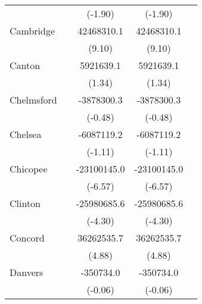{\begin{tabular}{l*{4}{c}}
                    &                     &     (-1.90)         &     (-1.90)         &                     \\
\addlinespace
Cambridge           &                     &  42468310.1\sym{***}&  42468310.1\sym{***}&                     \\
                    &                     &      (9.10)         &      (9.10)         &                     \\
\addlinespace
Canton              &                     &   5921639.1         &   5921639.1         &                     \\
                    &                     &      (1.34)         &      (1.34)         &                     \\
\addlinespace
Chelmsford          &                     &  -3878300.3         &  -3878300.3         &                     \\
                    &                     &     (-0.48)         &     (-0.48)         &                     \\
\addlinespace
Chelsea             &                     &  -6087119.2         &  -6087119.2         &                     \\
                    &                     &     (-1.11)         &     (-1.11)         &                     \\
\addlinespace
Chicopee            &                     & -23100145.0\sym{***}& -23100145.0\sym{***}&                     \\
                    &                     &     (-6.57)         &     (-6.57)         &                     \\
\addlinespace
Clinton             &                     & -25980685.6\sym{***}& -25980685.6\sym{***}&                     \\
                    &                     &     (-4.30)         &     (-4.30)         &                     \\
\addlinespace
Concord             &                     &  36262535.7\sym{***}&  36262535.7\sym{***}&                     \\
                    &                     &      (4.88)         &      (4.88)         &                     \\
\addlinespace
Danvers             &                     &   -350734.0         &   -350734.0         &                     \\
                    &                     &     (-0.06)         &     (-0.06)         &                     \\

\end{tabular}}
